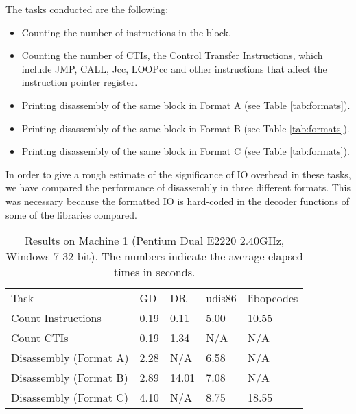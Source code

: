 \documentclass{article}
\begin{document}
The tasks conducted are the following:
\begin{itemize}
\item Counting the number of instructions in the block.
\item Counting the number of CTIs, the Control Transfer Instructions,
  which include JMP, CALL, Jcc, LOOPcc and other instructions that affect the
  instruction pointer register.
\item Printing disassembly of the same block in Format A (see Table \ref{tab:formats}).
\item Printing disassembly of the same block in Format B (see Table \ref{tab:formats}).
\item Printing disassembly of the same block in Format C (see Table \ref{tab:formats}).
\end{itemize}

\noindent In order to give a rough estimate of the significance of IO
overhead in these tasks, we have compared the performance of
disassembly in three different formats.  This was necessary because
the formatted IO is hard-coded in the decoder functions of some of the
libraries compared.

\begin{table}[p]
  \centering
  \begin{tabular}[center]{l|l|l|l|l}
    Task                   & GD    & DR   & udis86 & libopcodes \\
    Count Instructions     & 0.19 & 0.11  & 5.00  & 10.55       \\
    Count CTIs             & 0.19 & 1.34  & N/A   & N/A         \\
    Disassembly (Format A) & 2.28 & N/A   & 6.58  & N/A         \\
    Disassembly (Format B) & 2.89 & 14.01 & 7.08  & N/A         \\
    Disassembly (Format C) & 4.10 & N/A   & 8.75  & 18.55       \\
  \end{tabular}
  \caption{Results on Machine 1 (Pentium Dual E2220 2.40GHz, Windows 7 32-bit).
    The numbers indicate the average elapsed times in seconds.}
  \label{tab:machine1}

\end{table}
\end{document}
